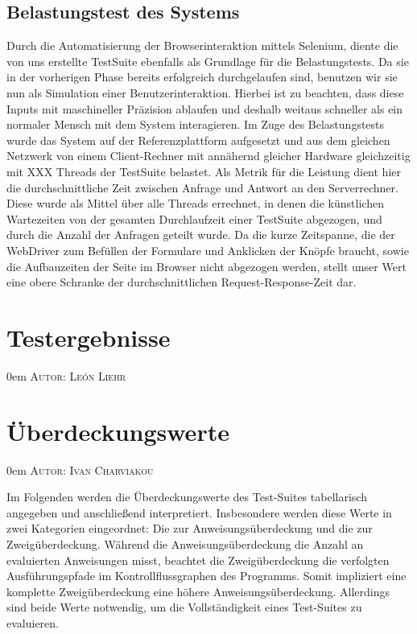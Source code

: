 \documentclass{article}
\makeatletter
\newcommand{\sectionauthor}[1]{
	{\parindent 0em \large \scshape Autor: #1 \par \nobreak \vspace*{1em}}
	\@afterheading
}
\makeatother
\begin{document}
\subsection{Belastungstest des Systems}
Durch die Automatisierung der Browserinteraktion mittels Selenium, diente die von uns erstellte TestSuite ebenfalls als Grundlage für die Belastungstests. Da sie in der vorherigen Phase bereits erfolgreich durchgelaufen sind, benutzen wir sie nun als Simulation einer Benutzerinteraktion. Hierbei ist zu beachten, dass diese Inputs mit maschineller Präzision ablaufen und deshalb weitaus schneller als ein normaler Mensch mit dem System interagieren. Im Zuge des Belastungstests wurde das System auf der Referenzplattform aufgesetzt und aus dem gleichen Netzwerk von einem Client-Rechner mit annähernd gleicher Hardware gleichzeitig mit XXX Threads der TestSuite belastet. Als Metrik für die Leistung dient hier die durchschnittliche Zeit zwischen Anfrage und Antwort an den Serverrechner. Diese wurde als Mittel über alle Threads errechnet, in denen die künstlichen Wartezeiten von der gesamten Durchlaufzeit einer TestSuite abgezogen, und durch die Anzahl der Anfragen geteilt wurde. Da die kurze Zeitspanne, die der WebDriver zum Befüllen der Formulare und Anklicken der Knöpfe braucht, sowie die Aufbauzeiten der Seite im Browser nicht abgezogen werden, stellt unser Wert eine obere Schranke der durchschnittlichen Request-Response-Zeit dar.

\newpage

\section{Testergebnisse}
\sectionauthor{León Liehr}



\newpage

\section{Überdeckungswerte}
\sectionauthor{Ivan Charviakou}

Im Folgenden werden die Überdeckungswerte des Test-Suites tabellarisch angegeben und anschließend interpretiert. 
Insbesondere werden diese Werte in zwei Kategorien eingeordnet: Die zur Anweisungsüberdeckung und die zur Zweigüberdeckung. 
Während die Anweisungsüberdeckung die Anzahl an evaluierten Anweisungen misst, beachtet die Zweigüberdeckung die verfolgten Ausführungspfade im Kontrollflussgraphen des Programms.
Somit impliziert eine komplette Zweigüberdeckung eine höhere Anweisungsüberdeckung. 
Allerdings sind beide Werte notwendig, um die Vollständigkeit eines Test-Suites zu evaluieren.
\end{document}
